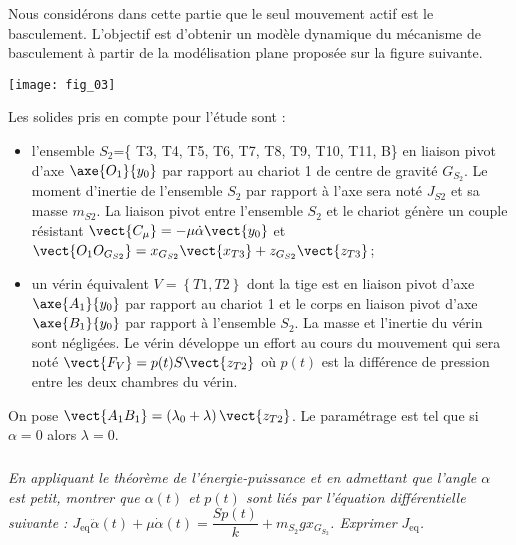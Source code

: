 \begin{multicols}{2}
Nous considérons dans cette partie que le seul mouvement actif est le basculement.
L’objectif est d’obtenir un modèle dynamique du mécanisme de basculement à partir de la modélisation plane proposée sur la figure suivante.


\begin{center}
\texttt{[image: fig\_03]}
\end{center}

Les solides pris en compte pour l’étude sont :
\begin{itemize}
\item l'ensemble $S_2$=\{ T3, T4, T5, T6, T7, T8, T9, T10, T11, B\} en liaison pivot d'axe $\axe{O_1}{y_0}$ par rapport au chariot 1 de centre de gravité $G_{S_2}$. Le moment d’inertie de l’ensemble $S_2$ par rapport à l’axe sera noté $J_{S2}$ et sa masse $m_{S2}$. La liaison pivot entre l’ensemble $S_2$ et le chariot génère un couple résistant $\vect{C_{\mu}}=-\mu\dot{\alpha}\vect{y_0}$ et $\vect{O_1O_{G_{S2}}}=x_{G_{S2}} \vect{x_{T3}}+z_{G_{S2}} \vect{z_{T3}}$; 
\item un vérin équivalent $V=\left\{ T1,T2\right\}$ dont la tige est en liaison pivot d’axe $\axe{A_1}{y_0}$ par rapport au chariot 1 et le corps en liaison pivot d’axe $\axe{B_1}{y_0}$ par rapport à l’ensemble $S_2$. La masse et l’inertie du vérin sont négligées. Le vérin développe un effort au cours du mouvement qui sera noté $\vect{F_V} = p(t) S \vect{z_{T2}}$ où $p(t)$ est la différence de pression entre les deux chambres du vérin.
\end{itemize}


On pose $\vect{A_1B_1} = \left( \lambda_0+\lambda\right)\vect{z_{T2}}$. Le paramétrage est tel que si $\alpha=0$ alors $\lambda=0$.

%
%


\subparagraph{}
\textit{En appliquant le théorème de l’énergie-puissance et en admettant que l’angle $\alpha$ est petit, montrer que $\alpha(t)$ et $p(t)$ sont liés par l’équation différentielle suivante :  $J_{\text{eq}}\ddot{\alpha}(t) + \mu \dot{\alpha}(t) =\dfrac{Sp(t)}{k}+m_{S_2}g x_{G_{S_2}}$. Exprimer $J_{\text{eq}}$.}
\ifprof
\begin{corrige}
\end{corrige}
\else
\fi

\ifprof
\else
\end{multicols}%
\fi

